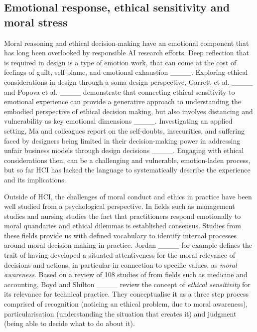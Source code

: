 

\subsection{Emotional response, ethical sensitivity and moral stress}
Moral reasoning and ethical decision-making have an emotional component that has long been overlooked by responsible AI research efforts. Deep reflection that is required in design is a type of emotion work, that can come at the cost of feelings of guilt, self-blame, and emotional exhaustion ____. Exploring ethical considerations in design through a soma design perspective, Garrett et al. ____ and Popova et al. ____ demonstrate that connecting ethical sensitivity to emotional experience can provide a generative approach to understanding the embodied perspective of ethical decision making, but also involves distancing and vulnerability as key emotional dimensions ____. Investigating an applied setting, Ma and colleagues report on the self-doubts, insecurities, and suffering faced by designers being limited in their decision-making power in addressing unfair business models through design decisions ____. Engaging with ethical considerations then, can be a challenging and vulnerable, emotion-laden process, but so far HCI has lacked the language to systematically describe the experience and its implications.

Outside of HCI, the challenges of moral conduct and ethics in practice have been well studied from a psychological perspective.
In fields such as management studies and nursing studies the fact that practitioners respond emotionally to moral quandaries and ethical dilemmas is established consensus. Studies from these fields provide us with defined vocabulary to identify internal processes around moral decision-making in practice. Jordan ____ for example defines the trait of having developed a situated attentiveness for the moral relevance of decisions and actions, in particular in connection to specific values, as \textit{moral awareness}. Based on a review of 108 studies of from fields such as medicine and accounting, Boyd and Shilton ____ review the concept of \textit{ethical sensitivity} for its relevance for technical practice. They conceptualise it as a three step process comprised of recognition (noticing an ethical problem, due to moral awareness), particularisation (understanding the situation that creates it) and judgment (being able to decide what to do about it).

